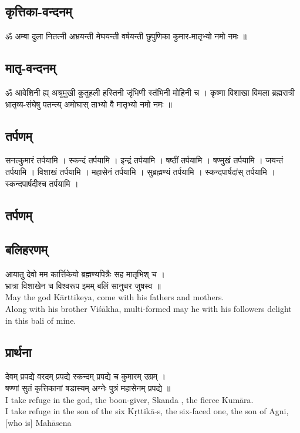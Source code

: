 \documentclass[13pt]{article}
\begin{document}
{\subsection{{\skt कृत्तिका-वन्दनम् }}
{\skt ॐ अम्बा दुला नितत्नी अभ्रयन्ती मेघयन्ती वर्षयन्ती छुपुणिका कुमार-मातृभ्यो नमो नमः ॥
}
\subsection{{\skt मातृ-वन्दनम् }}
{\skt ॐ आवेशिनी ह्य् अश्रुमुखी कुतुहली हस्तिनी जृंभिणी स्तंभिनी मोहिनी च । कृष्णा विशाखा विमला ब्रह्मरात्री भ्रातृव्य-संघेषु पतन्त्य् अमोघास् ताभ्यो वै मातृभ्यो नमो नमः ॥ 
}
\subsection{{\skt तर्पणम् }}
{\skt सनत्कुमारं तर्पयामि । स्कन्दं तर्पयामि । इन्द्रं तर्पयामि । षष्ठीं तर्पयामि । षण्मुखं तर्पयामि । जयन्तं तर्पयामि । विशाखं तर्पयामि । महासेनं तर्पयामि । सुब्रह्मण्यं तर्पयामि । स्कन्दपार्षदांस् तर्पयामि । स्कन्दपार्षदीश्च तर्पयामि ।
 }
\subsection{{\skt तर्पणम् }}
\subsection{{\skt बलिहरणम् }}
{\skt आयातु देवो मम कार्त्तिकेयो ब्रह्मण्यपित्रैः सह मातृभिश् च ।\\
भ्रात्रा विशाखेन च विश्वरूप इमम् बलिं सानुचर जुषस्व ॥ 
}\\[8pt]
May the god Kārttikeya, come with his fathers and mothers.\\
Along with his brother Viśākha, multi-formed may he with his followers delight in this bali of mine.
\subsection{{\skt प्रार्थना }}
{\skt  देवम् प्रपद्ये वरदम् प्रपद्ये स्कन्दम् प्रपद्ये च कुमारम् उग्रम् ।\\
षण्णां सुतं कृत्तिकानां षडास्यम् अग्नेः पुत्रं महासेनम् प्रपद्ये ॥
}\\[8pt]
I take refuge in the god, the boon-giver, Skanda , the fierce Kumāra.\\
I take refuge in the son of the six Kṛttikā-s, the six-faced one, the son of Agni, [who is] Mahāsena
}
\end{document}
